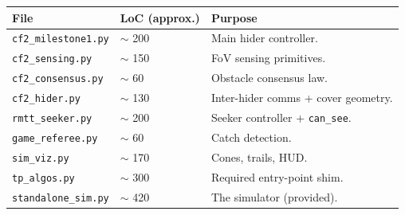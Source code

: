 \documentclass[11pt,a4paper]{article}
\newcommand{\code}[1]{\texttt{#1}}
\begin{document}
\begin{longtable}{p{4.5cm}p{2.5cm}p{8cm}}
\toprule
\textbf{File} & \textbf{LoC (approx.)} & \textbf{Purpose} \\
\midrule
\code{cf2\_milestone1.py} & $\sim$ 200 & Main hider controller. \\
\code{cf2\_sensing.py}    & $\sim$ 150 & FoV sensing primitives. \\
\code{cf2\_consensus.py}  & $\sim$ 60  & Obstacle consensus law. \\
\code{cf2\_hider.py}      & $\sim$ 130 & Inter-hider comms + cover geometry. \\
\code{rmtt\_seeker.py}    & $\sim$ 200 & Seeker controller + \code{can\_see}. \\
\code{game\_referee.py}   & $\sim$ 60  & Catch detection. \\
\code{sim\_viz.py}        & $\sim$ 170 & Cones, trails, HUD. \\
\code{tp\_algos.py}       & $\sim$ 300 & Required entry-point shim. \\
\code{standalone\_sim.py} & $\sim$ 420 & The simulator (provided). \\
\bottomrule
\end{longtable}
\end{document}
